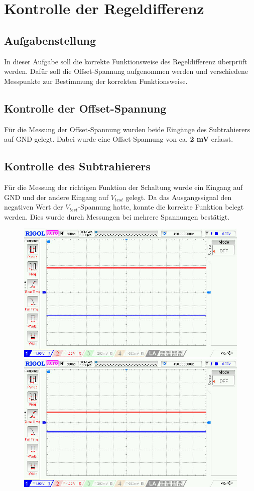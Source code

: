 \documentclass[twoside]{article}
\begin{document}
\newpage
\section{Kontrolle der Regeldifferenz}
\subsection{Aufgabenstellung}
In dieser Aufgabe soll die korrekte Funktionsweise des Regeldifferenz überprüft werden. Dafür soll die Offset-Spannung aufgenommen werden und verschiedene Messpunkte zur Bestimmung der korrekten Funktionsweise.

\subsection{Kontrolle der Offset-Spannung}
Für die Messung der Offset-Spannung wurden beide Eingänge des Subtrahierers auf GND gelegt. Dabei wurde eine Offset-Spannung von ca. \textbf{2 mV} erfasst.

\subsection{Kontrolle des Subtrahierers}
Für die Messung der richtigen Funktion der Schaltung wurde ein Eingang auf GND und der andere Eingang auf $V_{test}$ gelegt. Da das Ausgangssignal den negativen Wert der $V_{test}$-Spannung hatte, konnte die korrekte Funktion belegt werden. Dies wurde durch Messungen bei mehrere Spannungen bestätigt.
\begin{figure}[h]
\centering
\includegraphics[width=0.75\linewidth]{img/Oszi_06.jpg}
\includegraphics[width=0.75\linewidth]{img/Oszi_07.jpg}
\end{figure}
\end{document}
